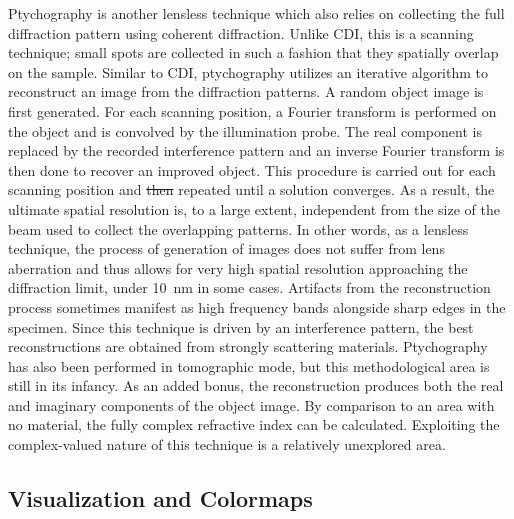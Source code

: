 \documentclass[journal=cmatex,manuscript=perspective]{achemso}
\providecommand{\DIFdeltex}[1]{{\protect\color{red}\sout{#1}}}                      %
\providecommand{\DIFdelbegin}{} %
\providecommand{\DIFdelend}{} %
\providecommand{\DIFdel}[1]{\texorpdfstring{\DIFdeltex{#1}}{}} %
\begin{document}
Ptychography is another lensless technique which also relies on
collecting the full diffraction pattern using coherent
diffraction. Unlike CDI, this is a scanning technique; small spots are
collected in such a fashion that they spatially overlap on the
sample. Similar to CDI, ptychography utilizes an iterative algorithm
to reconstruct an image from the diffraction patterns. A random object
image is first generated. For each scanning position, a Fourier
transform is performed on the object and is convolved by the
illumination probe. The real component is replaced by the recorded
interference pattern and an inverse Fourier transform is then done to
recover an improved object. This procedure is carried out for each
scanning position and \DIFdelbegin \DIFdel{then }\DIFdelend repeated until a solution converges. As a
result, the ultimate spatial resolution is, to a large extent,
independent from the size of the beam used to collect the overlapping
patterns. In other words, as a lensless technique, the process of
generation of images does not suffer from lens aberration and thus
allows for very high spatial resolution approaching the diffraction
limit, under \SI{10}{nm} in some cases. Artifacts from the
reconstruction process sometimes manifest as high frequency bands
alongside sharp edges in the specimen. Since this technique is driven
by an interference pattern, the best reconstructions are obtained from
strongly scattering materials. Ptychography has also been performed in
tomographic mode\cite{venkatakrishnan2016}, but this methodological
area is still in its infancy. As an added bonus, the reconstruction
produces both the real and imaginary components of the object
image. By comparison to an area with no material, the fully complex
refractive index can be calculated. Exploiting the complex-valued
nature of this technique is a relatively unexplored area.

\subsection{Visualization and Colormaps}
\end{document}
